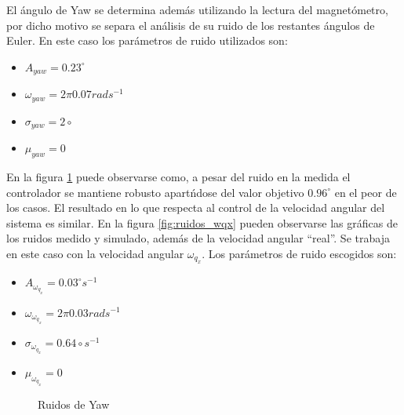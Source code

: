 \documentclass[main]{subfiles}
\begin{document}
El \'angulo de Yaw se determina adem\'as utilizando la lectura del magnet\'ometro, por dicho motivo se separa el an\'alisis de su ruido de los restantes \'angulos de Euler. En este caso los par\'ametros de ruido utilizados son:

\begin{itemize}
\item $A_{yaw} = 0.23^\circ$
\item $\omega_{yaw} = 2\pi 0.07 rad s^{-1}$
\item $\sigma_{yaw} = 2\circ$
\item $\mu_{yaw} = 0$
\end{itemize}

En la figura \ref{fig:ruidos_yaw} puede observarse como, a pesar del ruido en la medida el controlador se mantiene robusto apart\'ndose del valor objetivo $0.96^\circ$ en el peor de los casos. El resultado en lo que respecta al control de la velocidad angular del sistema es similar. En la figura \ref{fig:ruidos_wqx} pueden observarse las gr\'aficas de los ruidos medido y simulado, adem\'as de la velocidad angular ``real''. Se trabaja en este caso con la velocidad angular $\omega_{q_x}$. Los par\'ametros de ruido escogidos son:
\begin{itemize}
\item $A_{\omega_{q_x}} = 0.03^\circ s^{-1}$
\item $\omega_{\omega_{q_x}} = 2\pi 0.03 rad s^{-1}$
\item $\sigma_{\omega_{q_x}} = 0.64\circ s^{-1}$
\item $\mu_{\omega_{q_x}} = 0$
\end{itemize}
\begin{figure}
  \centering
  \caption{Ruidos de Yaw}
  \label{fig:ruidos_yaw}
\end{figure}
\end{document}
